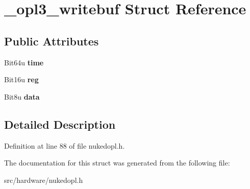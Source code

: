\hypertarget{struct__opl3__writebuf}{\section{\-\_\-opl3\-\_\-writebuf Struct Reference}
\label{struct__opl3__writebuf}
}
\subsection*{Public Attributes}
\begin{DoxyCompactItemize}
\item 
\hypertarget{struct__opl3__writebuf_a197d51afdfe566e9e5425eff82df3f4a}{Bit64u {\bfseries time}}\label{struct__opl3__writebuf_a197d51afdfe566e9e5425eff82df3f4a}

\item 
\hypertarget{struct__opl3__writebuf_a1ac91f25c3b671cc937bc6512edce0a8}{Bit16u {\bfseries reg}}\label{struct__opl3__writebuf_a1ac91f25c3b671cc937bc6512edce0a8}

\item 
\hypertarget{struct__opl3__writebuf_aca8fe299a80274f7824bd939820942bb}{Bit8u {\bfseries data}}\label{struct__opl3__writebuf_aca8fe299a80274f7824bd939820942bb}

\end{DoxyCompactItemize}


\subsection{Detailed Description}


Definition at line 88 of file nukedopl.\-h.



The documentation for this struct was generated from the following file\-:\begin{DoxyCompactItemize}
\item 
src/hardware/nukedopl.\-h\end{DoxyCompactItemize}
